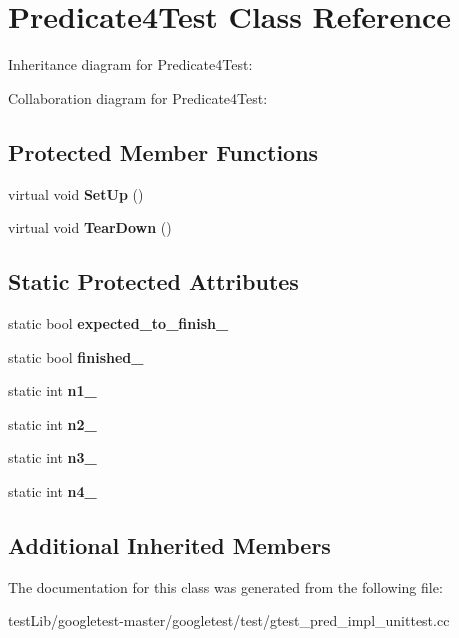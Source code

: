 \hypertarget{classPredicate4Test}{}\section{Predicate4\+Test Class Reference}
\label{classPredicate4Test}


Inheritance diagram for Predicate4\+Test\+:


Collaboration diagram for Predicate4\+Test\+:
\subsection*{Protected Member Functions}
\begin{DoxyCompactItemize}
\item 
\mbox{\label{classPredicate4Test_afcf9db5dc68e97291813cdfeb2aaa5d2}} 
virtual void {\bfseries Set\+Up} ()
\item 
\mbox{\label{classPredicate4Test_ab61983a4cdf3657b02bc2b81b67729c4}} 
virtual void {\bfseries Tear\+Down} ()
\end{DoxyCompactItemize}
\subsection*{Static Protected Attributes}
\begin{DoxyCompactItemize}
\item 
\mbox{\label{classPredicate4Test_a20600b5eda187c42ce4e812e77269654}} 
static bool {\bfseries expected\+\_\+to\+\_\+finish\+\_\+}
\item 
\mbox{\label{classPredicate4Test_acfd174bf9dfb5a91afbcdca17e797888}} 
static bool {\bfseries finished\+\_\+}
\item 
\mbox{\label{classPredicate4Test_a8eb30cd283e613f7a2e501a3969be9ae}} 
static int {\bfseries n1\+\_\+}
\item 
\mbox{\label{classPredicate4Test_a088fce743c747e3851c926cb3a87fda3}} 
static int {\bfseries n2\+\_\+}
\item 
\mbox{\label{classPredicate4Test_a00ae6ae54c7d6639d448c036aedb6114}} 
static int {\bfseries n3\+\_\+}
\item 
\mbox{\label{classPredicate4Test_ae42e23ce11e3f1c6b813496d6180cc67}} 
static int {\bfseries n4\+\_\+}
\end{DoxyCompactItemize}
\subsection*{Additional Inherited Members}


The documentation for this class was generated from the following file\+:\begin{DoxyCompactItemize}
\item 
test\+Lib/googletest-\/master/googletest/test/gtest\+\_\+pred\+\_\+impl\+\_\+unittest.\+cc\end{DoxyCompactItemize}
